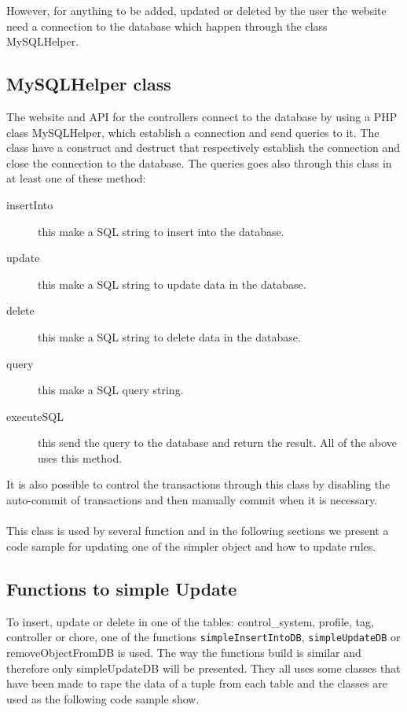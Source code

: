 However, for anything to be added, updated or deleted by the user the website need a connection to the database which happen through the class MySQLHelper. 

\subsection{MySQLHelper class}
The website and API for the controllers connect to the database by using a PHP class MySQLHelper, which establish a connection and send queries to it. The class have a construct and destruct that respectively establish the connection and close the connection to the database. The queries goes also through this class in at least one of these method:

\begin{description}
	\item[insertInto] this make a SQL string to insert into the database.
	\item[update] this make a SQL string to update data in the database.	
	\item[delete] this make a SQL string to delete data in the database.
	\item[query] this make a SQL query string.
	\item[executeSQL] this send the query to the database and return the result. All of the above uses this method.
\end{description}
  
It is also possible to control the transactions through this class by disabling the auto-commit of transactions and then manually commit when it is necessary. \\\\

This class is used by several function and in the following sections we present a code sample for updating one of the simpler object and how to update rules. 

\subsection{Functions to simple Update}
To insert, update or delete in one of the tables: control\_system, profile, tag, controller or chore, one of the functions \texttt{simpleInsertIntoDB}, \texttt{simpleUpdateDB} or removeObjectFromDB is used. The way the functions build is similar and therefore only simpleUpdateDB will be presented. They all uses some classes that have been made to rape the data of a tuple from each table and the classes are used as the following code sample show.

